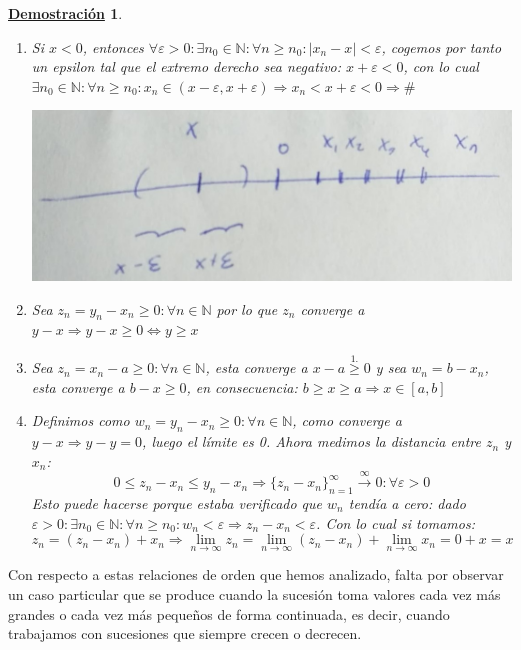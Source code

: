 \documentclass[10pt,a4paper,openright]{book}
\theoremstyle{break}
\newtheorem*{demo}{\underline{Demostración}}
\begin{document}
\begin{demo}
\begin{enumerate}
\item Si $x<0$, entonces $\forall \varepsilon >0: \exists n_0\in \mathbb N: \forall n\geq n_0: |x_n-x|<\varepsilon$, cogemos por tanto un epsilon tal que el extremo derecho sea negativo: $x+\varepsilon<0$, con lo cual $\exists n_0\in \mathbb N: \forall n \geq n_0: x_n\in (x-\varepsilon,x+\varepsilon)\Rightarrow x_n<x+\varepsilon<0\Rightarrow \#$

\begin{center}
\includegraphics[scale=0.25]{limite negativo}
\end{center}

\item Sea $z_n=y_n-x_n\geq 0: \forall n\in \mathbb N$ por lo que $z_n$ converge a $y-x\Rightarrow y-x\geq 0\Leftrightarrow y\geq x$

\item Sea $z_n=x_n-a\geq 0: \forall n \in \mathbb N$, esta converge a $x-a\stackrel{1.}{\geq}0$ y sea $w_n=b-x_n$, esta converge a $b-x\geq 0$, en consecuencia: $b\geq x\geq a\Rightarrow x\in [a,b]$

\item Definimos como $w_n=y_n-x_n\geq 0: \forall n \in \mathbb N$, como converge a $y-x\Rightarrow y-y=0$, luego el límite es 0. Ahora medimos la distancia entre $z_n$ y $x_n$:
$$0\leq z_n-x_n\leq y_n-x_n\Rightarrow \{z_n-x_n\}_{n=1}^\infty\stackrel{\infty}{\rightarrow} 0: \forall \varepsilon>0$$
Esto puede hacerse porque estaba verificado que $w_n$ tendía a cero: dado $\varepsilon>0: \exists n_0\in \mathbb N: \forall n\geq n_0: w_n<\varepsilon\Rightarrow z_n-x_n<\varepsilon$. Con lo cual si tomamos:
$$z_n=(z_n-x_n)+x_n\Rightarrow \lim_{n\rightarrow \infty} z_n=\lim_{n\rightarrow \infty} (z_n-x_n)+ \lim_{n\rightarrow \infty} x_n=0+x=x$$
\end{enumerate}
\end{demo}

Con respecto a estas relaciones de orden que hemos analizado, falta por observar un caso particular que se produce cuando la sucesión toma valores cada vez más grandes o cada vez más pequeños de forma continuada, es decir, cuando trabajamos con sucesiones que siempre crecen o decrecen.
\end{document}
